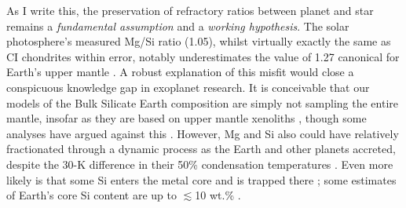 




As I write this, the preservation of refractory ratios between planet and star remains a \textit{fundamental assumption} and a \textit{working hypothesis}. The solar photosphere's measured Mg/Si ratio (1.05), whilst virtually exactly the same as CI chondrites within error, notably underestimates the value of 1.27 canonical for Earth's upper mantle \citep{ringwood_significance_1989, palme_solar_2014}. A robust explanation of this misfit would close a conspicuous knowledge gap in exoplanet research. It is conceivable that our models of the Bulk Silicate Earth composition are simply not sampling the entire mantle, insofar as they are based on upper mantle xenoliths \citep{matas_bulk_2007, javoy_chemical_2010}, though some analyses have argued against this \citep{lyubetskaya_chemical_2007a}. However, Mg and Si also could have relatively fractionated through a dynamic process as the Earth and other planets accreted, despite the 30-K difference in their 50\% condensation temperatures \citep{ringwood_significance_1989, miyazaki_dynamic_2020}. Even more likely is that some Si enters the metal core and is trapped there \citep{ringwood_chemical_1959, javoy_integral_1995, Wood2006, schaefer_metalsilicate_2017}; some estimates of Earth's core Si content are up to $\lesssim$10 wt.\% \citep{wade_core_2005, ricolleau_oxygen_2011, fischer_high_2015}.  



